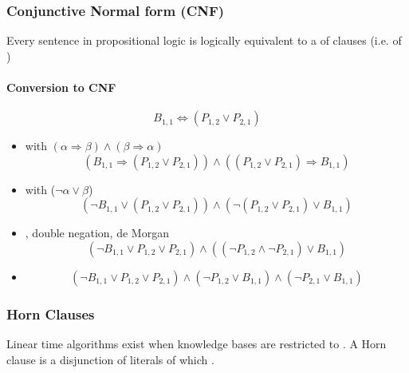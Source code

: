 \subsubsection{Conjunctive Normal form (CNF)}

Every sentence in propositional logic is logically equivalent to a  of clauses (i.e.  of )

\paragraph{Conversion to CNF}

\begin{equation*}
B_{1,1} \Leftrightarrow (P_{1,2} \lor P_{2, 1})
\end{equation*}
\begin{itemize}
\item {} with $(\alpha \Rightarrow \beta) \land (\beta \Rightarrow \alpha)$
	\begin{equation*}
	(B_{1,1} \Rightarrow (P_{1,2} \lor P_{2, 1})) \land ((P_{1,2} \lor P_{2, 1}) \Rightarrow B_{1,1})
	\end{equation*}
\item {} with ($\neg \alpha \lor \beta$)
	\begin{equation*}
	(\neg B_{1,1} \lor (P_{1,2} \lor P_{2, 1})) \land (\neg(P_{1,2} \lor P_{2, 1}) \lor B_{1,1})
	\end{equation*}
\item {}, double negation, de Morgan
	\begin{equation*}
	(\neg B_{1,1} \lor P_{1,2} \lor P_{2, 1}) \land ((\neg P_{1,2} \land \neg P_{2, 1}) \lor B_{1,1})
	\end{equation*}
\item {}
	\begin{equation*}
	(\neg B_{1,1} \lor P_{1,2} \lor P_{2, 1}) \land (\neg P_{1,2} \lor B_{1, 1}) \land (\neg P_{2, 1} \lor B_{1,1})
	\end{equation*}
\end{itemize}

\subsubsection{Horn Clauses}

Linear time algorithms exist when knowledge bases are restricted to . A Horn clause is a disjunction of literals of which .

